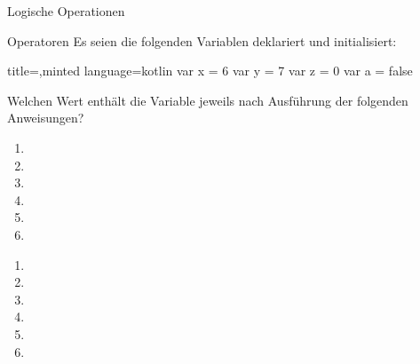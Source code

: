 \begin{task}[points=auto]{Logische Operationen }
    \begin{subtask*}[points=0]{Operatoren}
        Es seien die folgenden Variablen deklariert und initialisiert:
        \begin{codeBlock}[]{title=,minted language=kotlin}
            var x = 6
            var y = 7
            var z = 0
            var a = false
        \end{codeBlock}
        Welchen Wert enthält die Variable  jeweils nach Ausführung der folgenden Anweisungen?
        \begin{enumerate}
            \item {}
            \item {}
            \item {}
            \item {}
            \item {}
            \item {}
        \end{enumerate}

        \begin{solution}
            \begin{multicols}{3}
                \begin{enumerate}
                    \item {}
                    \item {}
                    \item {}
                    \item {}
                    \item {}
                    \item {}
                \end{enumerate}
            \end{multicols}
        \end{solution}
    \end{subtask*}
\end{task}
